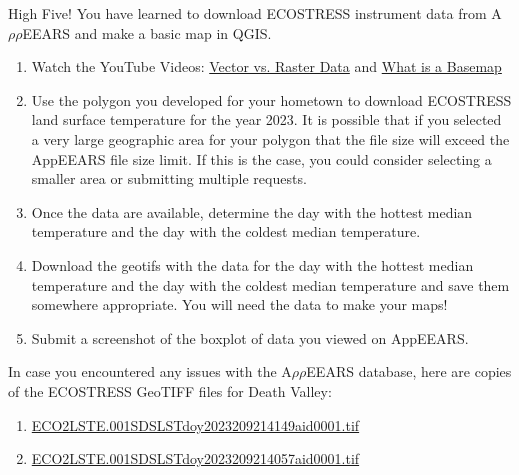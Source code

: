 \documentclass[oneside,a4paper,11pt,explicit]{book}
\begin{document}
High Five! You have learned to download ECOSTRESS instrument data from A$\rho\rho$EEARS and make a basic map in QGIS.

\begin{tcolorbox}[colback=yellow!5!white,colframe=MACred,title= \vspace{.2em} \Large Make a Map Assignments]
	\large
	\begin{enumerate}
  \item Watch the YouTube Videos:
\href{https://youtu.be/N-3zF10LbHg?si=HLST3CbIbDo_JuIR}{Vector vs. Raster Data}
and \href{https://youtu.be/N-3zF10LbHg?si=HLST3CbIbDo_JuIR}{What is a Basemap}
  
  \item  Use the polygon you developed for your hometown to download ECOSTRESS land surface temperature for the year 2023. It is possible that if you selected a very large geographic area for your polygon that the file size will exceed the AppEEARS file size limit. If this is the case, you could consider selecting a smaller area or submitting multiple requests.

  \item Once the data are available, determine the day with the hottest median temperature and the day with the coldest median temperature. 

  \item Download the geotifs with the data for the day with the hottest median temperature and the day with the coldest median temperature and save them somewhere appropriate. You will need the data to make your maps!

  \item Submit a screenshot of the boxplot of data you viewed on AppEEARS.  
	\end{enumerate}
\end{tcolorbox}

\begin{tcolorbox}[colback=yellow!5!white,title=\textbf{Datafiles}]
	\large
	In case you encountered any issues with the A$\rho\rho$EEARS database, here are copies of the ECOSTRESS GeoTIFF files for Death Valley:
	\begin{enumerate}
		\item \href{https://jeremydforsythe.github.io/icecream-tutorials/Tutorial5_AccessingRemoteSensingDataWithAppears/ECO2LSTE.001_SDS_LST_doy2023209214149_aid0001.tif}{\small ECO2LSTE.001\textunderscore SDS\textunderscore LST\textunderscore doy2023209214149\textunderscore aid0001.tif}
		\item \href{https://jeremydforsythe.github.io/icecream-tutorials/Tutorial5_AccessingRemoteSensingDataWithAppears/ECO2LSTE.001_SDS_LST_doy2023209214057_aid0001.tif}{\small ECO2LSTE.001\textunderscore SDS\textunderscore LST\textunderscore doy2023209214057\textunderscore aid0001.tif}
	\end{enumerate}
\end{tcolorbox}
\end{document}
